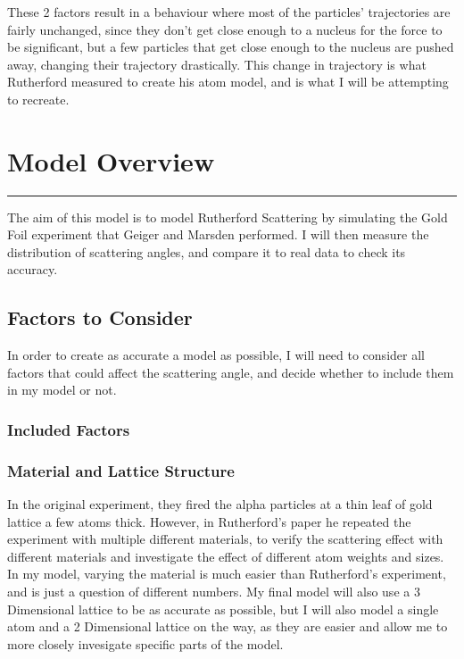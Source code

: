 \documentclass[11pt]{article}
\begin{document}
These 2 factors result in a behaviour where most of the particles'
trajectories are fairly unchanged, since they don't get close enough to
a nucleus for the force to be significant, but a few particles that get
close enough to the nucleus are pushed away, changing their trajectory
drastically. This change in trajectory is what Rutherford measured to
create his atom model, and is what I will be attempting to recreate.

    \hypertarget{model-overview}{%
\section{Model Overview}\label{model-overview}}

\begin{center}\rule{0.5\linewidth}{0.5pt}\end{center}

The aim of this model is to model Rutherford Scattering by simulating
the Gold Foil experiment that Geiger and Marsden performed. I will then
measure the distribution of scattering angles, and compare it to real
data to check its accuracy.

\hypertarget{factors-to-consider}{%
\subsection{Factors to Consider}\label{factors-to-consider}}

In order to create as accurate a model as possible, I will need to
consider all factors that could affect the scattering angle, and decide
whether to include them in my model or not.

\hypertarget{included-factors}{%
\subsubsection{Included Factors}\label{included-factors}}

\hypertarget{material-and-lattice-structure}{%
\subsubsection*{Material and Lattice
Structure}\label{material-and-lattice-structure}}
%
In the original experiment, they fired the alpha particles at a thin
leaf of gold lattice a few atoms thick. However, in Rutherford's paper
he repeated the experiment with multiple different materials, to verify
the scattering effect with different materials and investigate the
effect of different atom weights and sizes. In my model, varying the
material is much easier than Rutherford's experiment, and is just a
question of different numbers. My final model will also use a 3
Dimensional lattice to be as accurate as possible, but I will also model
a single atom and a 2 Dimensional lattice on the way, as they are easier
and allow me to more closely invesigate specific parts of the model.
\end{document}
